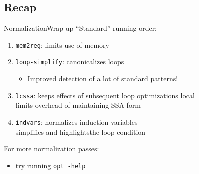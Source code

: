 \subsection{Recap}


\begin{frame}{Normalization}{Wrap-up}
``Standard'' running order:

\begin{enumerate}
\item \texttt{mem2reg}: limits use of memory
\item \texttt{loop-simplify}: canonicalizes loops
	\begin{itemize}
	\item Improved detection of a lot of standard patterns!
	\end{itemize}
\item \texttt{lcssa}: keeps effects of subsequent loop optimizations local\\
      limits overhead of maintaining SSA form
\item \texttt{indvars}: normalizes induction variables\\
			simplifies and highlightsthe loop condition
\end{enumerate}

\vfill
For more normalization passes:

\begin{itemize}
\item try running \texttt{opt -help}
\end{itemize}
\end{frame}

